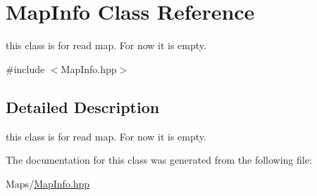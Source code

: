 \hypertarget{classMapInfo}{}\section{Map\+Info Class Reference}
\label{classMapInfo}


this class is for read map. For now it is empty.  




{\ttfamily \#include $<$Map\+Info.\+hpp$>$}



\subsection{Detailed Description}
this class is for read map. For now it is empty. 

The documentation for this class was generated from the following file\+:\begin{DoxyCompactItemize}
\item 
Maps/\hyperlink{MapInfo_8hpp}{Map\+Info.\+hpp}\end{DoxyCompactItemize}
